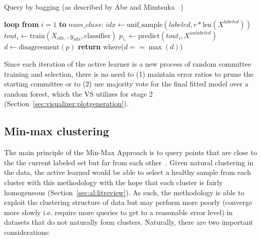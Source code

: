 \tablespacing
\begin{algorithm}[H]
	\caption{Query by bagging (as described by Abe and Mimtsuka 
	~\cite{abe1998})}\label{alg:al:methods:bagging}
	\begin{algorithmic}[1]
		\State \textbf{loop from} $i=1$ \textbf{to} $num\_class$:
		\State \indent $idx \gets \text{unif\_sample}(labeled, 
		r*\text{len}(X^{labeled}) )$
		\State \indent $\textit{tout}_{i} \gets 
		\text{train}(X_{idx, },y_{idx},\text{classifier})$
		\State \indent $p_{i,} \gets 
		\text{predict}(\textit{tout}_i,X^{unlabeled})$
		\State $d \gets \text{disagreement}(p)$
		\State \textbf{return} where($d==\max{(d)}$)
		\EndProcedure
	\end{algorithmic}
\end{algorithm}
\bodyspacing

\noindent Since each iteration of the active learner is a new process of random 
committee 
training and selection, there is no need to (1) maintain error ratios to prune 
the starting committee or to (2) use majority vote for the final 
fitted model over a random forest, which the VS utilizes for stage 
2 (Section~\ref{sec:visualizer:plotgeneration}).










\subsection{Min-max clustering}
\label{sec:al:methods:clustering}

The main principle of the Min-Max Approach is to query points that are close to 
the the current labeled set but far from each other~\cite{vu2010}. Given 
natural clustering in the data, the active learned would be able to select a 
healthy sample from each cluster with this methodology with the hope that each 
cluster is fairly homogeneous (Section~\ref{sec:al:litreview}). As such, the 
methodology is able to exploit the clustering structure of data but may perform 
more poorly (converge more slowly i.e. require more queries to get to a 
reasonable error level) in datasets that do not naturally form clusters. 
Naturally, there are two important considerations:

